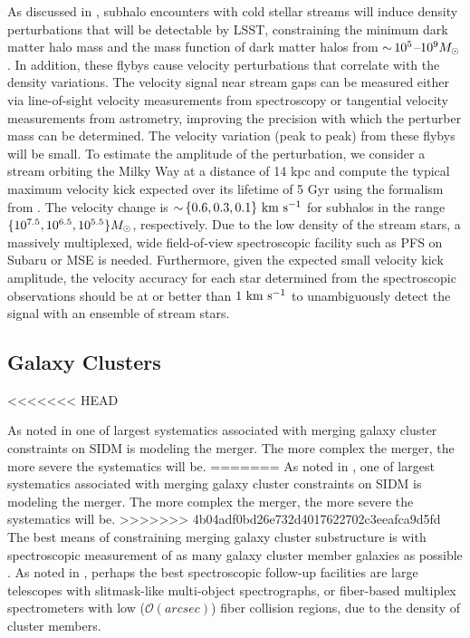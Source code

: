 As discussed in , subhalo encounters with cold stellar streams will induce density perturbations that will be detectable by LSST, constraining the minimum dark matter halo mass and the mass function of dark matter halos from $ {\sim}\,10^5$--$10^9 M_\odot$. In addition, these flybys cause velocity perturbations that correlate with the density variations.  The velocity signal near stream gaps can be measured either via line-of-sight velocity measurements from spectroscopy or tangential velocity measurements from astrometry, improving the precision with which the perturber mass can be determined.
The velocity variation (peak to peak) from these flybys will be small. To estimate the amplitude of the perturbation, we consider a stream orbiting the Milky Way at a distance of 14 kpc and compute the typical maximum velocity kick expected over its lifetime of 5 Gyr using the formalism from \citet{erkal2016}.  The velocity change is $ {\sim}\, \{0.6, 0.3, 0.1\} \mathrm{\,\mathrm{\,km}\,\mathrm{\,s}^{-1}}$ for subhalos in the range $\{ 10^{7.5}, 10^{6.5}, 10^{5.5} \} M_\odot$, respectively. %
Due to the low density of the stream stars, a massively multiplexed, wide field-of-view spectroscopic facility such as PFS on Subaru or MSE is needed. Furthermore, given the expected small velocity kick amplitude, the velocity accuracy for each star determined from the spectroscopic observations should be at or better than $1 \mathrm{\,\mathrm{\,km}\,\mathrm{\,s}^{-1}}$ to unambiguously detect the signal with an ensemble of stream stars. 

\subsection{Galaxy Clusters }
<<<<<<< HEAD

As noted in  one of largest systematics associated with merging galaxy cluster constraints on SIDM is modeling the merger. The more complex the merger, the more severe the systematics will be.
=======
As noted in , one of largest systematics associated with merging galaxy cluster constraints on SIDM is modeling the merger. The more complex the merger, the more severe the systematics will be.
>>>>>>> 4b04adf0bd26e732d4017622702c3eeafca9d5fd
The best means of constraining merging galaxy cluster substructure is with spectroscopic measurement of as many galaxy cluster member galaxies as possible \citep[\eg,][]{Golovich:2018}.
As noted in \citet{2016arXiv161001661N}, perhaps the best spectroscopic follow-up facilities are large telescopes with slitmask-like multi-object spectrographs, or fiber-based multiplex spectrometers with low ($\mathcal{O}(\unit{arcsec})$) fiber collision regions, due to the density of cluster members.


